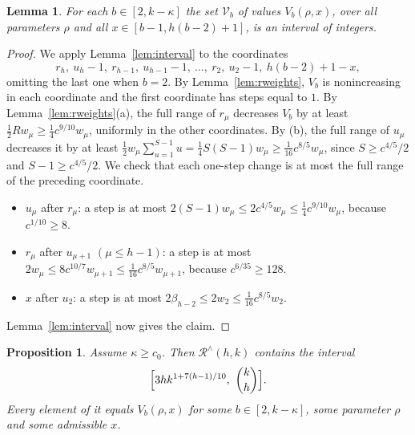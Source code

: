 \documentclass[11pt]{amsart}
\newtheorem{proposition}[theorem]{Proposition}
\newtheorem{lemma}[theorem]{Lemma}
\theoremstyle{definition}
\theoremstyle{remark}
\numberwithin{equation}{section}
\newcommand{\Rr}{\mathcal{R}^{\wedge}}
\begin{document}
\begin{lemma}\label{lem:rbox}
For each $b\in[2,k-\kappa]$ the set $\mathcal V_b$ of values $V_b(\rho,x)$, over all parameters $\rho$ and all $x\in[b-1,h(b-2)+1]$, is an interval of integers.
\end{lemma}

\begin{proof}
We apply Lemma~\ref{lem:interval} to the coordinates
\[
r_h,\ u_h-1,\ r_{h-1},\ u_{h-1}-1,\ \dots,\ r_2,\ u_2-1,\ h(b-2)+1-x,
\]
omitting the last one when $b=2$. By Lemma~\ref{lem:rweights}, $V_b$ is nonincreasing in each coordinate and the first coordinate has steps equal to $1$. By Lemma~\ref{lem:rweights}(a), the full range of $r_\mu$ decreases $V_b$ by at least $\frac12Rw_\mu\ge\frac14c^{9/10}w_\mu$, uniformly in the other coordinates. By (b), the full range of $u_\mu$ decreases it by at least $\frac12w_\mu\sum_{u=1}^{S-1}u=\frac14S(S-1)w_\mu\ge\frac1{16}c^{8/5}w_\mu$, since $S\ge c^{4/5}/2$ and $S-1\ge c^{4/5}/2$. We check that each one-step change is at most the full range of the preceding coordinate.
\begin{itemize}[leftmargin=2em]
\item $u_\mu$ after $r_\mu$: a step is at most $2(S-1)w_\mu\le 2c^{4/5}w_\mu\le\frac14c^{9/10}w_\mu$, because $c^{1/10}\ge 8$.
\item $r_\mu$ after $u_{\mu+1}$ $(\mu\le h-1)$: a step is at most $2w_\mu\le 8c^{10/7}w_{\mu+1}\le\frac1{16}c^{8/5}w_{\mu+1}$, because $c^{6/35}\ge 128$.
\item $x$ after $u_2$: a step is at most $2\beta_{h-2}\le 2w_2\le\frac1{16}c^{8/5}w_2$.
\end{itemize}
Lemma~\ref{lem:interval} now gives the claim.
\end{proof}

\begin{proposition}\label{prop:rlarge}
Assume $\kappa\ge c_0$. Then $\Rr(h,k)$ contains the interval
\[
\Bigl[3hk^{1+7(h-1)/10},\ \binom kh\Bigr].
\]
Every element of it equals $V_b(\rho,x)$ for some $b\in[2,k-\kappa]$, some parameter $\rho$ and some admissible $x$.
\end{proposition}
\end{document}
